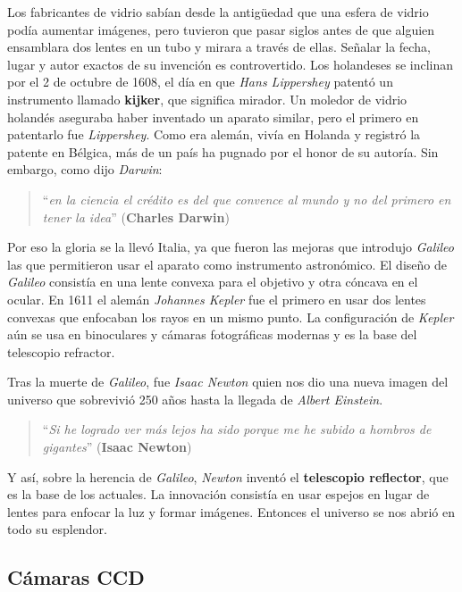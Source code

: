 \bigskip
Los fabricantes de vidrio sabían desde la antigüedad que una esfera de vidrio podía aumentar imágenes, pero tuvieron que pasar siglos antes de que alguien ensamblara dos lentes en un tubo y mirara a través de ellas. Señalar la fecha, lugar y autor exactos de su invención es controvertido. Los holandeses se inclinan por el 2 de octubre de 1608, el día en que \textit{Hans Lippershey} patentó un instrumento llamado \textbf{kijker}, que significa mirador. Un moledor de vidrio holandés aseguraba haber inventado un aparato similar, pero el primero en patentarlo fue \textit{Lippershey}. Como era alemán, vivía en Holanda y registró la patente en Bélgica, más de un país ha pugnado por el honor de su autoría. Sin embargo, como dijo \textit{Darwin}:
\begin{quote}``\textit{en la ciencia el crédito es del que convence al mundo y no del primero en tener la idea}''
\newline(\textbf{Charles Darwin})
\end{quote}
Por eso la gloria se la llevó Italia, ya que fueron las mejoras que introdujo \textit{Galileo} las que permitieron usar el aparato como instrumento astronómico. El diseño de \textit{Galileo} consistía en una lente convexa para el objetivo y otra cóncava en el ocular. En 1611 el alemán \textit{Johannes Kepler} fue el primero en usar dos lentes convexas que enfocaban los rayos en un mismo punto. La configuración de \textit{Kepler} aún se usa en binoculares y cámaras fotográficas modernas y es la base del telescopio refractor.

\bigskip
Tras la muerte de \textit{Galileo}, fue \textit{Isaac Newton} quien nos dio una nueva imagen del universo que sobrevivió 250 años hasta la llegada de \textit{Albert Einstein}.

\begin{quote}``\textit{Si he logrado ver más lejos ha sido porque me he subido a hombros de gigantes}''
\newline(\textbf{Isaac Newton})
\end{quote}

Y así, sobre la herencia de \textit{Galileo}, \textit{Newton} inventó el \textbf{telescopio reflector}, que es la base de los actuales. La innovación consistía en usar espejos en lugar de lentes para enfocar la luz y formar imágenes. Entonces el universo se nos abrió en todo su esplendor.

\subsection{Cámaras CCD}

